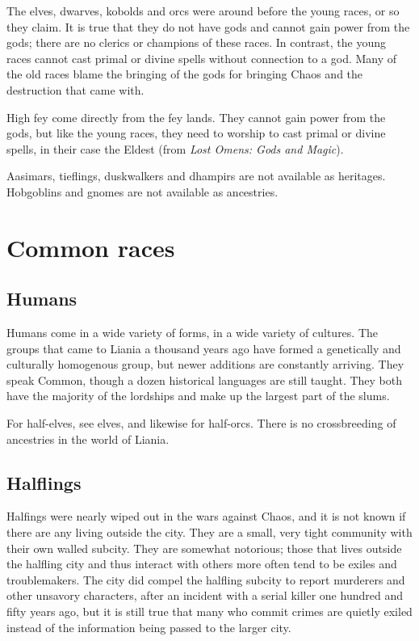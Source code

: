 \documentclass{report}
\begin{document}
The elves, dwarves, kobolds and orcs were around before the young races, or so they claim.
It is true that they do not have gods and cannot gain power from the gods; there
are no clerics or champions of these races. In contrast, the young races cannot
cast primal or divine spells without connection to a god. Many of the old races
blame the bringing of the gods for bringing Chaos and the destruction that came with.

High fey come directly from the fey lands. They cannot gain power from the gods, but like the young
races, they need to worship to cast primal or divine spells, in their case
the Eldest (from \emph{Lost Omens: Gods and Magic}).

Aasimars, tieflings, duskwalkers and dhampirs are not available as heritages.
Hobgoblins and gnomes are not available as ancestries.

\section {Common races}

\subsection{Humans}

Humans come in a wide variety of forms, in a wide variety of cultures. The
groups that came to Liania a thousand years ago have formed a genetically and
culturally homogenous group, but newer additions are constantly arriving. They
speak Common, though a dozen historical languages are still taught. They both
have the majority of the lordships and make up the largest part of the slums.

For half-elves, see elves, and likewise for half-orcs. There is no crossbreeding
of ancestries in the world of Liania.

\subsection{Halflings}

Halfings were nearly wiped out in the wars against Chaos, and it is not known
if there are any living outside the city. They are a small, very tight community
with their own walled subcity. They are somewhat notorious; those that lives
outside the halfling city and thus interact with others more often tend to be
exiles and troublemakers. The city did compel the halfling subcity to report
murderers and other unsavory characters, after an incident with a serial killer
one hundred and fifty years ago, but it is still true that many who commit crimes
are quietly exiled instead of the information being passed to the larger city.
\end{document}
